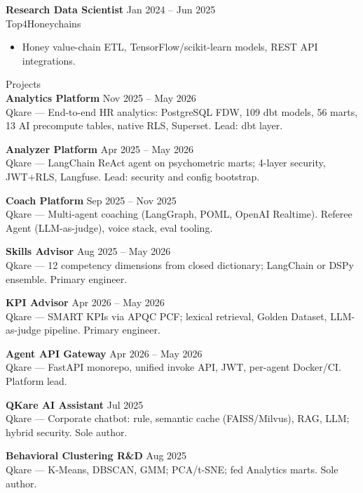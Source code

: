 \documentclass[11pt,a4paper]{article}
\newcommand{\cvsection}[1]{%
  \vspace{0.7em}%
  {\normalsize\fontseries{m}\selectfont #1}\\[0.25em]
}
\newcommand{\jobentry}[4]{%
  \textbf{#1} \hfill {\small #2}\\
  {\small #3} \hfill {\small #4}\\[0.2em]
}
\begin{document}
\jobentry{Research Data Scientist}{Jan 2024 -- Jun 2025}{Top4Honeychains}{}
\begin{itemize}[leftmargin=1.2em, nosep, topsep=2pt]
  \item Honey value-chain ETL, TensorFlow/scikit-learn models, REST API integrations.
\end{itemize}

\cvsection{Projects}

\textbf{Analytics Platform} \hfill Nov 2025 -- May 2026\\
Qkare --- End-to-end HR analytics: PostgreSQL FDW, 109 dbt models, 56 marts, 13 AI precompute tables, native RLS, Superset. Lead: dbt layer.

\vspace{0.25em}
\textbf{Analyzer Platform} \hfill Apr 2025 -- May 2026\\
Qkare --- LangChain ReAct agent on psychometric marts; 4-layer security, JWT+RLS, Langfuse. Lead: security and config bootstrap.

\vspace{0.25em}
\textbf{Coach Platform} \hfill Sep 2025 -- Nov 2025\\
Qkare --- Multi-agent coaching (LangGraph, POML, OpenAI Realtime). Referee Agent (LLM-as-judge), voice stack, eval tooling.

\vspace{0.25em}
\textbf{Skills Advisor} \hfill Aug 2025 -- May 2026\\
Qkare --- 12 competency dimensions from closed dictionary; LangChain or DSPy ensemble. Primary engineer.

\vspace{0.25em}
\textbf{KPI Advisor} \hfill Apr 2026 -- May 2026\\
Qkare --- SMART KPIs via APQC PCF; lexical retrieval, Golden Dataset, LLM-as-judge pipeline. Primary engineer.

\vspace{0.25em}
\textbf{Agent API Gateway} \hfill Apr 2026 -- May 2026\\
Qkare --- FastAPI monorepo, unified invoke API, JWT, per-agent Docker/CI. Platform lead.

\vspace{0.25em}
\textbf{QKare AI Assistant} \hfill Jul 2025\\
Qkare --- Corporate chatbot: rule, semantic cache (FAISS/Milvus), RAG, LLM; hybrid security. Sole author.

\vspace{0.25em}
\textbf{Behavioral Clustering R\&D} \hfill Aug 2025\\
Qkare --- K-Means, DBSCAN, GMM; PCA/t-SNE; fed Analytics marts. Sole author.
\end{document}
